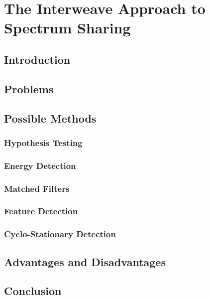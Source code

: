 \chapter{The Interweave Approach to Spectrum Sharing}
\section{Introduction}
\section{Problems}
\section{Possible Methods}
\subsection{Hypothesis Testing}
\subsection{Energy Detection}
\subsection{Matched Filters}
\subsection{Feature Detection}
\subsection{Cyclo-Stationary Detection}
\section{Advantages and Disadvantages}
\section{Conclusion}